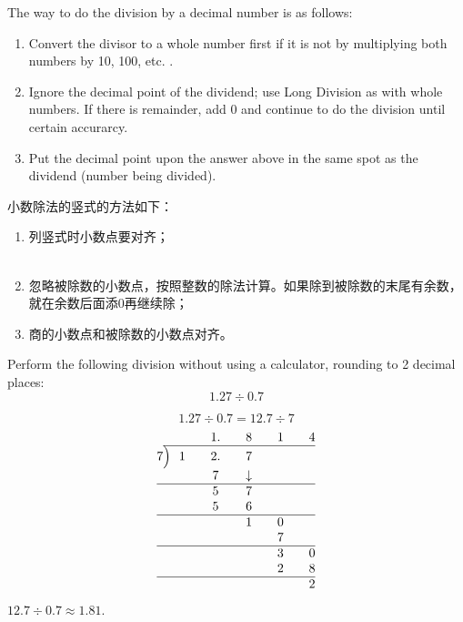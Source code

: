 \begin{paracol}{2}
The way to do the division by a decimal number is as follows:
\begin{enumerate}
\item Convert the divisor to a whole number first if it is not by multiplying both numbers by 10, 100, etc. .
\item Ignore the decimal point of the dividend; use Long Division as with whole numbers. If there is remainder, add 0 and continue to do the division until certain accurarcy.
\item Put the decimal point upon the answer above in the same spot as the dividend (number being divided).
\end{enumerate}
\switchcolumn[1]
小数除法的竖式的方法如下：\\  
\begin{enumerate}
\item 列竖式时小数点要对齐；\\ \\ 
\item 忽略被除数的小数点，按照整数的除法计算。如果除到被除数的末尾有余数，就在余数后面添0再继续除；\\ 
\item 商的小数点和被除数的小数点对齐。
\end{enumerate}
\end{paracol}

\begin{example}
Perform the following division without using a calculator, rounding to 2 decimal places:
$$1.27\div 0.7$$
\end{example}
\begin{solution}
$$1.27\div 0.7 = 12.7 \div 7$$
$$
\arraycolsep=0pt
\begin{array}{rccccc}
&&\quad 1.\quad&\quad8\quad&\quad 1\quad&\quad4\\
\cline{2-6}
7&{\Big)}\ \ 1\quad&\quad2.\quad&\quad7\quad&&\\
&&\quad7\quad&\quad\downarrow\quad&&\\
\hline
&&\quad5\quad&\quad7\quad&&\\
&&\quad 5\quad&\quad 6\quad&&\\ \hline
&&&\quad 1\quad&\quad 0\quad&\\
&&&&\quad 7\quad&\\ \hline
&&&&\quad 3 \quad&\quad 0\\
&&&&\quad 2 \quad&\quad 8\\ \hline
&&&&&\quad 2
\end{array}
$$
$12.7\div 0.7 \approx  1.81$.
\end{solution}

   \newpage